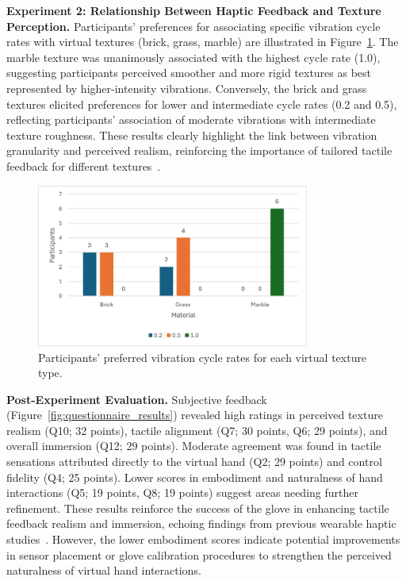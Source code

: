 \documentclass[graybox]{svmult}
\begin{document}
\textbf{Experiment 2: Relationship Between Haptic Feedback and Texture Perception.}  
Participants' preferences for associating specific vibration cycle rates with virtual textures (brick, grass, marble) are illustrated in Figure~\ref{fig:ex2_results}. The marble texture was unanimously associated with the highest cycle rate (1.0), suggesting participants perceived smoother and more rigid textures as best represented by higher-intensity vibrations. Conversely, the brick and grass textures elicited preferences for lower and intermediate cycle rates (0.2 and 0.5), reflecting participants' association of moderate vibrations with intermediate texture roughness. These results clearly highlight the link between vibration granularity and perceived realism, reinforcing the importance of tailored tactile feedback for different textures~\cite{otake2022vibrotactile}.

\begin{figure}\centering
	\includegraphics[width=0.8\textwidth]{figure/ex2_result.png}%
	\caption{Participants' preferred vibration cycle rates for each virtual texture type.}\label{fig:ex2_results}
\end{figure}


\textbf{Post-Experiment Evaluation.}  
Subjective feedback (Figure~\ref{fig:questionnaire_results}) revealed high ratings in perceived texture realism (Q10; 32 points), tactile alignment (Q7; 30 points, Q6; 29 points), and overall immersion (Q12; 29 points). Moderate agreement was found in tactile sensations attributed directly to the virtual hand (Q2; 29 points) and control fidelity (Q4; 25 points). Lower scores in embodiment and naturalness of hand interactions (Q5; 19 points, Q8; 19 points) suggest areas needing further refinement. These results reinforce the success of the glove in enhancing tactile feedback realism and immersion, echoing findings from previous wearable haptic studies~\cite{pacchierotti2017wearable}. However, the lower embodiment scores indicate potential improvements in sensor placement or glove calibration procedures to strengthen the perceived naturalness of virtual hand interactions.
\end{document}
